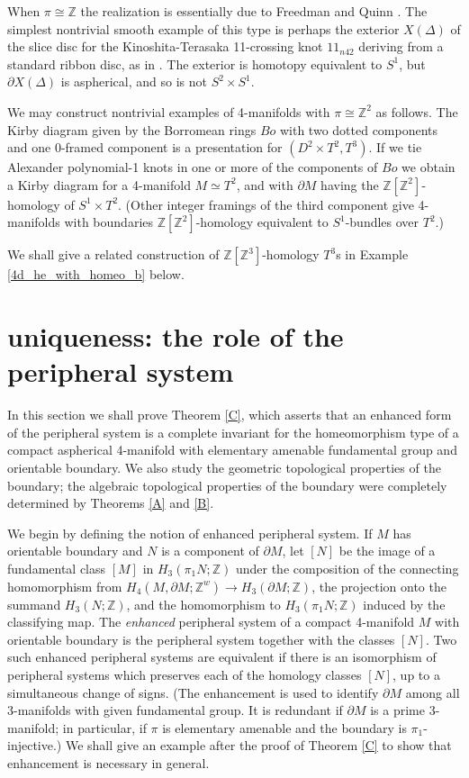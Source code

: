 \documentclass[12pt]{amsart}
\theoremstyle{definition}
\newcommand{\Z}{\mathbb Z}
\begin{document}
When $\pi\cong\Z$ the realization is essentially due to 
Freedman and Quinn  \cite[Proposition 11.6A]{FQ}.
The simplest nontrivial smooth example of this type is perhaps the 
exterior $X(\Delta)$ of the slice disc for the Kinoshita-Terasaka 11-crossing knot 
$11_{n42}$ deriving from a standard ribbon disc, as in \cite[Figure 1.4]{HiA}.
The exterior  is homotopy equivalent to $S^1$, 
but $\partial{X(\Delta)}$ is aspherical, and so is not $S^2\times{S^1}$.

We may construct nontrivial examples of 4-manifolds with $\pi\cong\Z^2$ as follows.
The Kirby diagram given by the Borromean rings $Bo$
with two dotted components and one 0-framed component 
is a presentation for $(D^2\times{T^2},T^3)$.
If we tie Alexander polynomial-1 knots in one or more of the components
of $Bo$ we obtain a Kirby diagram for a 4-manifold $M\simeq{T^2}$,
and with $\partial{M}$ having the $\mathbb{Z}[\mathbb{Z}^2]$-homology of  $S^1\times{T^2}$. 
(Other integer framings of the third component give 4-manifolds with boundaries 
$\mathbb{Z}[\mathbb{Z}^2]$-homology equivalent to $S^1$-bundles over $T^2$.)

We shall give a related construction of $\mathbb{Z}[\mathbb{Z}^3]$-homology $T^3$s in Example  \ref{4d_he_with_homeo_b} below.

\section{uniqueness: the role of the peripheral system} \label{section:uniqueness}

In this section we shall prove Theorem \ref{C}, 
which asserts that an enhanced form of the peripheral system is 
a complete invariant for the homeomorphism type of 
a compact aspherical 4-manifold with elementary amenable fundamental group and orientable boundary.  We also study the geometric topological properties of the boundary; the algebraic topological properties of the boundary were completely determined by Theorems \ref{A} and \ref{B}.

We begin by defining the notion of enhanced peripheral system.
If $M$ has orientable boundary and $N$ is a component of $\partial{M}$,
let $[N]$ be the image of a fundamental class $[M]$
in $H_3(\pi_1N;\Z)$ under the composition of the connecting homomorphism
from $H_4(M, \partial M;\Z^w)\to H_3(\partial M;\Z)$, the projection onto the summand
$H_3(N;\Z)$, and the homomorphism to $H_3(\pi_1N;\Z)$ induced by the classifying map.
The {\it enhanced\/} peripheral system of a compact 4-manifold $M$ 
with orientable boundary is the peripheral system together with the  classes $[N]$.
Two such enhanced peripheral systems are equivalent if there is an isomorphism of peripheral systems which preserves each of the homology classes $[N]$, 
up to a simultaneous change of signs.
(The enhancement is used to identify $\partial{M}$ among all 3-manifolds
with given fundamental group.
It is redundant if $\partial{M}$ is a prime 3-manifold;
in particular, if $\pi$ is elementary amenable and the boundary is $\pi_1$-injective.)
We shall give an example after the proof of Theorem \ref{C} to 
show that enhancement is necessary in general.
\end{document}
